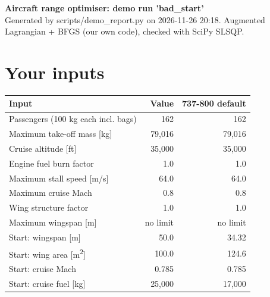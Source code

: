 \documentclass[10pt,a4paper]{article}
\begin{document}
\begin{center}{\Large\bfseries Aircraft range optimiser: demo run 'bad\_start'}\\[4pt]
{\small Generated by scripts/demo\_report.py on 2026-11-26 20:18. Augmented Lagrangian + BFGS (our own code), checked with SciPy SLSQP.}\end{center}
\section{Your inputs}
\begin{table}[H]\centering\small
\begin{tabular}{lrr}
\toprule
\textbf{Input} & \textbf{Value} & \textbf{737-800 default} \\
\midrule
Passengers (100 kg each incl. bags) & 162 & 162 \\
Maximum take-off mass [kg] & 79,016 & 79,016 \\
Cruise altitude [ft] & 35,000 & 35,000 \\
Engine fuel burn factor & 1.0 & 1.0 \\
Maximum stall speed [m/s] & 64.0 & 64.0 \\
Maximum cruise Mach & 0.8 & 0.8 \\
Wing structure factor & 1.0 & 1.0 \\
Maximum wingspan [m] & no limit & no limit \\
Start: wingspan [m] & 50.0 & 34.32 \\
Start: wing area [m\textsuperscript{2}] & 100.0 & 124.6 \\
Start: cruise Mach & 0.785 & 0.785 \\
Start: cruise fuel [kg] & 25,000 & 17,000 \\
\bottomrule
\end{tabular}
\end{table}
\end{document}
